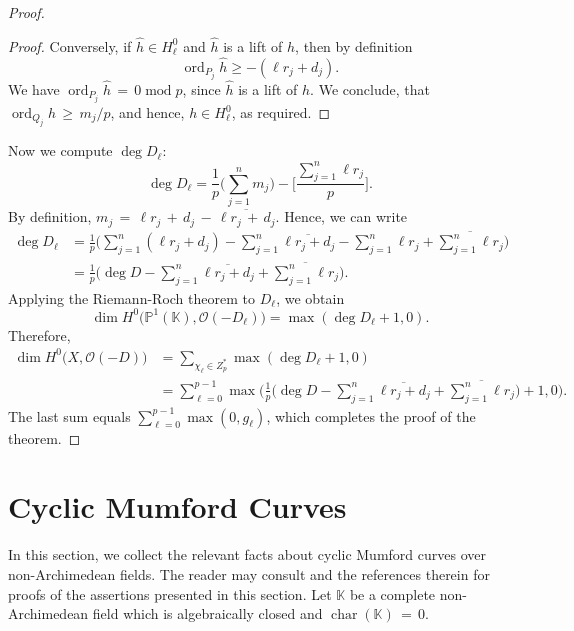 \documentclass[]{amsart}
\numberwithin{equation}{section}
\DeclareMathOperator{\charOp}{char}
\DeclareMathOperator{\modOp}{mod}
\DeclareMathOperator{\ord}{ord}
\begin{document}
\begin{proof}
\begin{proof}
Conversely, if $\widehat{h} \in H_{\ell}^{0}$ and $\widehat{h}$ is a lift of $h$, 
then by definition $$\ord_{P_j} \widehat{h} \geq - (\ell r_j + d_j).$$ 
We  have  $\ord_{P_j} \widehat{h}  \,{=}\,0\modOp p$,
since $\widehat{h}$ is a lift of $h$. 
We conclude, that $\ord_{Q_j} h \,{\geq}\, m_j/p$, 
and hence, $h\in H_{\ell}^{0}$, as required. 
\end{proof}
Now we compute $\deg D_{\ell}$: 
\begin{equation}
\deg D_{\ell} =\frac{1}{p}\bigg(\sum_{j=1}^{n} m_j \bigg)
-\bigg[\frac{\sum_{j=1}^n \ell r_j}{p}\bigg]. 
\end{equation}
By definition, $m_j\,{=}\, \ell r_j \,{+}\, d_j \,{-}\,\overline{\ell r_j \,{+}\, d_j}$. Hence, we can write
\begin{equation}
\begin{split}
\deg D_{\ell} &= \frac{1}{p}\bigg(\sum_{j=1}^n (\ell r_j + d_j)
-\sum_{j=1}^n \overline{\ell r_j + d_j}-\sum_{j=1}^n \ell r_j+\overline{\sum_{j=1}^n \ell r_j}\bigg) \\
&=\frac{1}{p}\bigg(\deg D -\sum_{j=1}^n\overline{\ell r_j + d_j}+\overline{\sum_{j=1}^n \ell r_j}\bigg).
\end{split}
\end{equation}
Applying the Riemann-Roch theorem to $D_{\ell}$, we obtain
$$\dim H^0 \big(\mathbb{P}^{1}(\mathbb{K}),\mathcal{O}(-D_{\ell}) \big)
= \max (\deg D_{\ell} +1,0). $$ 
Therefore,
\begin{equation}
\begin{split}
\dim H^0 \big(X,\mathcal O(-D)\big) &= \sum_{\chi_{\ell} \in Z_p^{*}} \max(\deg D_{\ell} +1,0)\\
&=\sum_{\ell=0}^{p-1} \max\bigg(\frac{1}{p}\bigg(\deg D - \sum_{j=1}^n \overline{\ell r_j + d_j}
+\overline{\sum_{j=1}^n \ell r_j}\bigg)+1,0\bigg).
\end{split}
\end{equation}
The last sum equals 
$\sum_{\ell=0}^{p-1} \max(0,g_{\ell})$, which completes the proof of the theorem. 
\end{proof}

\section{Cyclic Mumford Curves}\label{firstsection} 
In this section, we collect the relevant facts about cyclic Mumford curves 
over non-Archimedean fields. The reader may consult \cite{GV,V1,V2} and the references therein for proofs of the assertions presented in this section. 
Let $\mathbb{K}$ be a complete non-Archimedean field 
which is algebraically closed and $\charOp (\mathbb{K})\,{=}\,0.$
\end{document}
